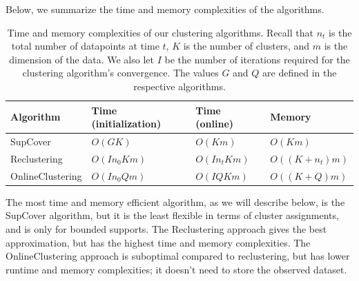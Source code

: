 Below, we summarize the time and memory complexities of the algorithms.

\begin{table}[h!]
\vspace{-0.5em}
\label{tab:complex}

\caption{Time and memory complexities of our clustering algorithms. Recall that $n_t$ is the total number of datapoints at time $t$, $K$ is the number of clusters, and $m$ is the dimension of the data. We also let $I$ be the number of iterations required for the clustering algorithm's convergence. The values $G$ and $Q$ are defined in the respective algorithms.}

\centering
\begin{tabular}{llll}
\toprule
 Algorithm & Time (initialization) & Time (online)  & Memory \\
\midrule

SupCover  & $O(GK)$ & $O(Km)$  &  $O(Km)$\\
\midrule

Reclustering  & $O(In_0Km)$  & $O(In_tKm)$ & $O((K+n_t)m)$  \\
\midrule
OnlineClustering & $O(In_0Qm)$ & $O(IQKm)$ & $O((K+Q)m)$ \\
\bottomrule
\end{tabular}
\label{table:example}
\vspace{-0.5em}
\end{table}

The most time and memory efficient algorithm, as we will describe below, is the SupCover algorithm, but it is the least flexible in terms of cluster assignments, and is only for bounded supports. The Reclustering approach gives the best approximation, but has the highest time and memory complexities. The OnlineClustering approach is suboptimal compared to reclustering, but has lower runtime and memory complexities; it doesn't need to store the observed dataset. 
 

